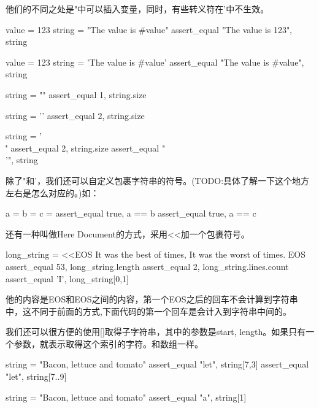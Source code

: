 他们的不同之处是"中可以插入变量，同时，有些转义符在'中不生效。
\begin{Ruby}
	value = 123
    string = "The value is #{value}"
    assert_equal "The value is 123", string
    
    value = 123
    string = 'The value is #{value}'
    assert_equal "The value is \#{value}", string
    
    string = "\n"
    assert_equal 1, string.size
    
    string = '\n'
    assert_equal 2, string.size
    
    string = '\\\''
    assert_equal 2, string.size
    assert_equal "\\'", string
\end{Ruby}

除了"和'，我们还可以自定义包裹字符串的符号。(TODO:具体了解一下这个地方左右是怎么对应的。)如：
\begin{Ruby}
    a = %
    b = %
    c = %
    assert_equal true, a == b
    assert_equal true, a == c
\end{Ruby}

还有一种叫做Here Document的方式，采用<<加一个包裹符号。
\begin{Ruby}
    long_string = <<EOS
It was the best of times,
It was the worst of times.
EOS
    assert_equal 53, long_string.length
    assert_equal 2, long_string.lines.count
    assert_equal 'I', long_string[0,1]
\end{Ruby}
他的内容是EOS和EOS之间的内容，第一个EOS之后的回车不会计算到字符串中，这不同于前面的方式,下面代码的第一个回车是会计入到字符串中间的。

我们还可以很方便的使用[]取得子字符串，其中的参数是start, length。如果只有一个参数，就表示取得这个索引的字符。和数组一样。
\begin{Ruby}
    string = "Bacon, lettuce and tomato"
    assert_equal "let", string[7,3]
    assert_equal "let", string[7..9]
    
    string = "Bacon, lettuce and tomato"
    assert_equal "a", string[1]
\end{Ruby}

